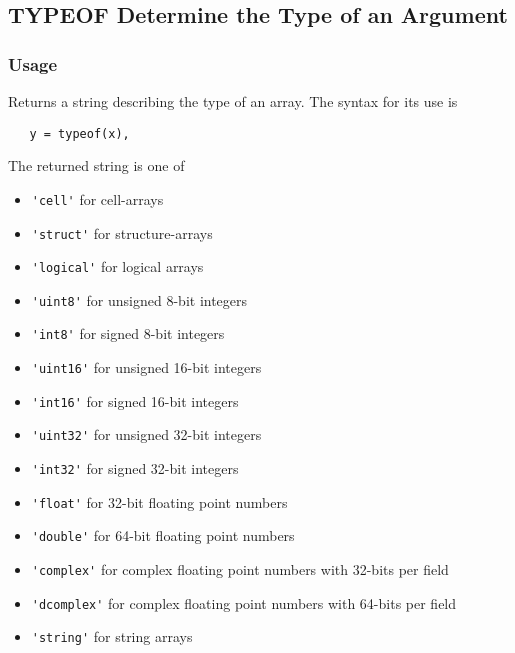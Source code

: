 %
%
%
\subsection{TYPEOF Determine the Type of an Argument}
\subsubsection{Usage}
Returns a string describing the type of an array.  The syntax for its use is
\begin{verbatim}
   y = typeof(x),
\end{verbatim}
The returned string is one of
\begin{itemize}
\item \verb|'cell'| for cell-arrays
\item \verb|'struct'| for structure-arrays
\item \verb|'logical'| for logical arrays
\item \verb|'uint8'| for unsigned 8-bit integers
\item \verb|'int8'| for signed 8-bit integers
\item \verb|'uint16'| for unsigned 16-bit integers
\item \verb|'int16'| for signed 16-bit integers
\item \verb|'uint32'| for unsigned 32-bit integers
\item \verb|'int32'| for signed 32-bit integers
\item \verb|'float'| for 32-bit floating point numbers
\item \verb|'double'| for 64-bit floating point numbers
\item \verb|'complex'| for complex floating point numbers with 32-bits per field
\item \verb|'dcomplex'| for complex floating point numbers with 64-bits per field
\item \verb|'string'| for string arrays
\end{itemize}

